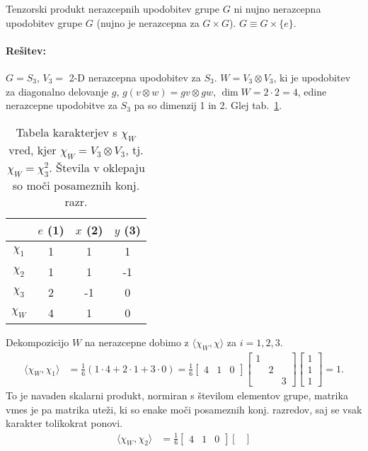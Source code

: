 \begin{zgled}
	Tenzorski produkt nerazcepnih upodobitev grupe $G$ ni nujno nerazcepna upodobitev grupe $G$ (nujno je nerazcepna za $G \times G$).
	$G \equiv G \times \{e\}$.
	
	\paragraph{Re\v sitev:} $G = S_3$, $V_3 =$ 2-D nerazcepna upodobitev za $S_3$. $W = V_3 \otimes V_3$, ki je upodobitev za
	diagonalno delovanje $g$, $g(v \otimes w) = gv \otimes gw$, $\dim W = 2\cdot2 = 4$, edine nerazcepne upodobitve za $S_3$ pa
	so dimenzij 1 in 2. Glej tab.~\ref{chiW}.
	\begin{table}[H]\centering
		\caption{Tabela karakterjev s $\chi_W$ vred, kjer $\chi_W = V_3 \otimes V_3$,
			tj. $\chi_W = \chi_3^2$. \v Stevila v oklepaju so mo\v ci posameznih konj. razr.}
		\begin{tabular}{c | c c c}
			& $e$ (1) &  $x$ (2) & $y$ (3) \\
			\hline
			$\chi_1$ & 1 & 1 & 1\\
			$\chi_2$ & 1 & 1 &-1\\
			$\chi_3$ & 2 &-1 & 0\\
			\hline
			$\chi_W$ & 4 & 1 & 0
		\end{tabular}
		\label{chiW}
	\end{table}
	Dekompozicijo $W$ na nerazcepne dobimo z $\langle \chi_W, \chi\rangle$ za $i = 1,2,3$.
	\begin{align*}
		\langle \chi_W, \chi_1 \rangle &= \frac{1}{6} (1 \cdot 4 + 2 \cdot 1 + 3 \cdot 0) = \frac{1}{6}
			\begin{bmatrix} 4 & 1 & 0 \end{bmatrix} \begin{bmatrix}
			1 &   &   \\
			  & 2 &   \\
			  &   & 3
			\end{bmatrix} \begin{bmatrix} 1 \\ 1 \\ 1 \end{bmatrix} = 1.
	\end{align*}
	To je navaden skalarni produkt, normiran s \v stevilom elementov grupe, matrika vmes je pa matrika ute\v zi, ki so enake
	mo\v ci posameznih konj. razredov, saj se vsak karakter tolikokrat ponovi.
	\begin{align*}
		\langle \chi_W, \chi_2 \rangle &= \frac{1}{6}\begin{bmatrix} 4 & 1 & 0 \end{bmatrix} \begin{bmatrix}

\end{bmatrix}
\end{align*}
\end{zgled}

